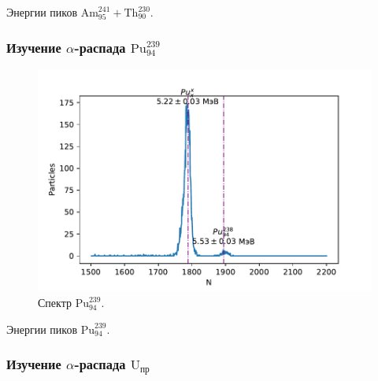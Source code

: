 \documentclass[10pt,a4paper]{article}
\begin{document}
\begin{multicols}{2}
	\begin{table}[H]
		\addtolength{\tabcolsep}{-4pt}
		\footnotesize
		
		\caption{Энергии пиков $\text{Am}_{95}^{241} + \text{Th}_{90}^{230}$.}
		\label{tab:th_am}
	\end{table}
	
	
	\subsubsection*{Изучение $\alpha$-распада $\text{Pu}_{94}^{239}$}
	
	\begin{figure}[H]
		\includegraphics[width=1\textwidth]{gen/fig-pu.pdf}
		\caption{Спектр $\text{Pu}_{94}^{239}$.}
		\label{fig:pu}
	\end{figure}
	
	\begin{table}[H]
		\addtolength{\tabcolsep}{-4pt}
		\footnotesize
		
		\caption{Энергии пиков $\text{Pu}_{94}^{239}$.}
		\label{tab:pu}
	\end{table}
	
	
	\subsubsection*{Изучение $\alpha$-распада $\text{U}_{\text{пр}}$}
	

\end{multicols}
\end{document}
